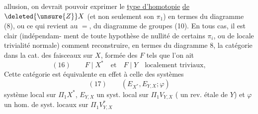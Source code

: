 allusion, on devrait pouvoir exprimer 
le \uline{type d'homotopie} \uline{de} $\deleted{\unsure{Z}}X$
(et non seulement son $\pi_1$) en termes du
diagramme  (8), ou ce qui revient au
$=$, du diagramme de groupes (10).
En tous cas, il est clair (indépendam-
ment de toute hypothèse de nullité de
certains $\pi_i$, ou de locale trivialité normale)
comment reconstruire, en termes du
diagramme 8, la  catégorie  dans la cat. des
faisceaux sur $X$,  formée des $F$ tels
que l'on ait
\[
(16)\qquad F\mid X^*\quad\text{et}\quad F\mid Y\quad\text{localement triviaux},
\]
Cette catégorie  est équivalente en effet
à celle des systèmes
\[
(17)\qquad (E_{X^*},E_{Y,X};\varphi)
\]
 système local sur $\Pi_1 X^*$, $E_{Y,X}$ un
syst. local sur $\Pi_1 V_{Y,X}$ ( un rev. étale
de $Y$) et $\varphi$ un hom. de syst. locaux sur $\Pi_1V^*_{Y,X}$
